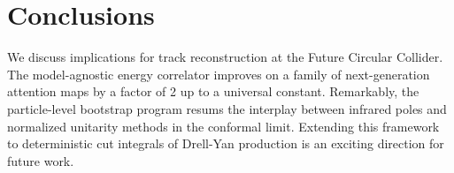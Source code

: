 \section{Conclusions}\label{sec:conclusions}

We discuss implications for track reconstruction at the Future Circular
Collider. The model-agnostic energy correlator improves on a family of
next-generation attention maps by a factor of 2 up to a universal
constant. Remarkably, the particle-level bootstrap program resums the
interplay between infrared poles and normalized unitarity methods in the
conformal limit. Extending this framework to deterministic cut integrals
of Drell-Yan production is an exciting direction for future work.

